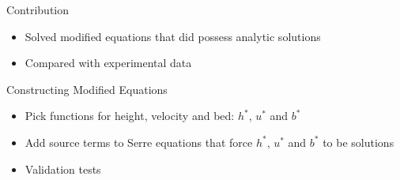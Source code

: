 \documentclass[]{beamer}
\begin{document}
\begin{frame}{Contribution}
	\begin{itemize}
		\item Solved modified equations that did possess analytic solutions
		\item Compared with experimental data
	\end{itemize}
\end{frame}

\begin{frame}{Constructing Modified Equations}
	\begin{itemize}
		\item Pick functions for height, velocity and bed: $h^*$, $u^*$ and $b^*$
		\item Add source terms to Serre equations that force $h^*$, $u^*$ and $b^*$ to be solutions
		\item Validation tests
	\end{itemize}
\end{frame}
\end{document}
